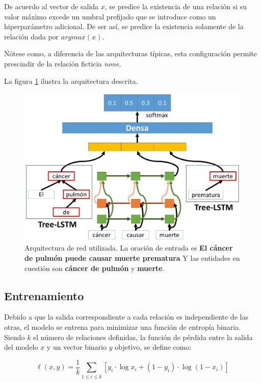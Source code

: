 De acuerdo al vector de salida $x$, se predice la existencia de una relación si su valor máximo excede un umbral prefijado que se introduce como un hiperparámetro adicional. De ser así, se predice la existencia solamente de la relación dada por $argmax(x)$.
	
Nótese como, a diferencia de las arquitecturas típicas, esta configuración permite prescindir de la relación ficticia \textit{none}.

La figura \ref{fig:rel_model} ilustra la arquitectura descrita.

\begin{figure}[h!]
	\centering
	\includegraphics[width=1\linewidth]{Graphics/rel_model_class.jpg}
	\caption{Arquitectura de red utilizada. La oración de entrada es \textbf{El cáncer de pulmón puede causar muerte prematura} Y las entidades en cuestión son \textbf{cáncer de pulmón} y \textbf{muerte}.}\label{fig:rel_model}
\end{figure}

\subsection{Entrenamiento}

Debido a que la salida correspondiente a cada relación es independiente de las otras, el modelo se entrena para minimizar una función de entropía binaria.
Siendo $k$ el número de relaciones definidas, la función de pérdida entre la salida del modelo $x$ y un vector binario $y$ objetivo, se define como:

\begin{equation*}
	\ell(x, y) = \frac{1}{k}\sum_{1\leq i\leq k}{\left[ y_i \cdot \log x_i + (1 - y_i) \cdot \log (1 - x_i) \right]}
\end{equation*}

